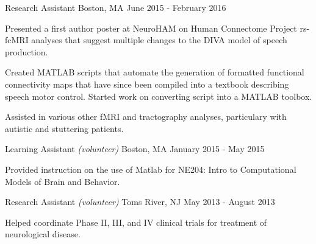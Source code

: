\begin{cventries}
    {Research Assistant}
    {Boston, MA}
    {June 2015 - February 2016}
    {\begin{cvitems}
        \item{Presented a first author poster at NeuroHAM on Human Connectome Project rs-fcMRI analyses that suggest multiple changes to the DIVA model of speech production.\vspace*{0.1cm}}
        \item{Created MATLAB scripts that automate the generation of formatted functional connectivity maps that have since been compiled into a textbook describing speech motor control. Started work on converting script into a MATLAB toolbox.\vspace*{0.1cm}}
        \item{Assisted in various other fMRI and tractography analyses, particulary with autistic and stuttering patients.}
    \end{cvitems}}
    \vspace*{0.2cm}
    
    {Learning Assistant \textnormal{\small{\textit{(volunteer)}}}}
    {Boston, MA}
    {January 2015 - May 2015}
    {\begin{cvitems}
        \item{Provided instruction on the use of Matlab for NE204: Intro to Computational Models of Brain and Behavior.}
    \end{cvitems}}
    \vspace*{0.2cm}
    
    {Research Assistant \textnormal{\small{\textit{(volunteer)}}}}
    {Toms River, NJ}
    {May 2013 - August 2013}
    {\begin{cvitems}
        \item{Helped coordinate Phase II, III, and IV clinical trials for treatment of neurological disease.}
    \end{cvitems}}
    \vspace*{0.2cm}
    
\vspace*{-0.2cm}
\end{cventries}

